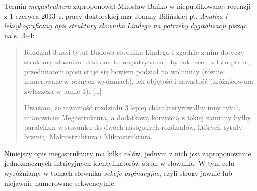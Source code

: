 \documentclass[12]{mwart}
\begin{document}

Termin \textit{megastruktura} zaproponował Mirosław Bańko w
niepublikowanej recenzji z 1 czerwca 2013~r. pracy doktorskiej mgr
Joanny Bilińskiej pt. \textit{Analiza i leksykograficzny opis
  struktury słownika Lindego na potrzeby dygitalizacji} \citep{bc347}
pisząc na s.~3--4:
\begin{quote}
  Rozdział 3 nosi tytuł Budowa słownika Lindego i zgodnie z nim dotyczy
struktury słownika. Jest ona tu rozpatrywana - by tak rzec - z lotu
ptaka, przedmiotem opisu staje się bowiem podział na woluminy (różnie
numerowane w różnych wydaniach), ich objętość i zawartość
(zróżnicowana zwłaszcza w tomie 1), [\ldots]

Uważam, że zawartość rozdziału 3 lepiej charakteryzowałby inny tytuł,
mianowicie: Megastruktura, a dodatkową korzyścią z takiej zamiany
byłby paralelizm w stosunku do dwóch następnych rozdziałów, których
tytuły brzmią: Makrostruktura i Mikrostruktura. 
\end{quote}

Niniejszy opis megastruktury ma kilka celów, jednym z nich jest
zaproponowanie jednoznacznych intuicyjnych identyfikatorów stron w
słowniku.  W tym celu wyróżniamy w tomach słownika \textit{sekcje
  paginacyjne}, czyli strony jawnie lub niejawnie numerowane
sekwencyjnie. 
\end{document}
